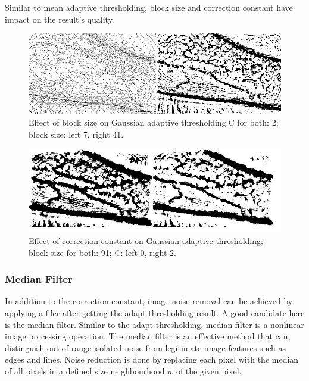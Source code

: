Similar to mean adaptive thresholding, block size and correction constant have impact on the result’s quality.  

\begin{figure}[H]
\centering
\includegraphics[scale=0.8]{figures/compare3.JPG}
\caption[Effect of block size on Gaussian adaptive thresholding]{Effect of block size on Gaussian adaptive thresholding;C for both: 2; block size: left 7, right 41.}\label{fig:compare3}
\end{figure}


\begin{figure}[H]
\centering
\includegraphics[scale=0.8]{figures/compare4.JPG}
\caption[Effect of correction constant on Gaussian adaptive thresholding]{Effect of correction constant on Gaussian adaptive thresholding;\\ block size for both: 91; C: left 0, right 2.}\label{fig:compare4}
\end{figure}

\subsubsection{Median Filter}
In addition to the correction constant, image noise removal can be achieved by applying a filer after getting the adapt thresholding result. A good candidate here is the median filter. Similar to the adapt thresholding, median filter is a nonlinear image processing operation. The median filter is an effective method that can, distinguish out-of-range isolated noise from legitimate image features such as edges and lines. Noise reduction is done by replacing each pixel with the median of all pixels in a defined size neighbourhood $w$ of the given pixel. 

